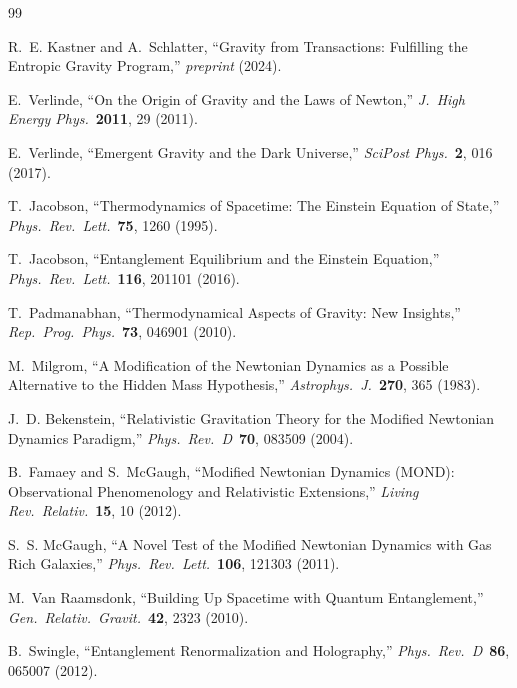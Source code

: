 \documentclass[11pt, a4paper]{article}
\theoremstyle{plain}
\theoremstyle{definition}
\theoremstyle{remark}
\begin{document}
\begin{thebibliography}{99}

R.~E. Kastner and A.~Schlatter,
``Gravity from Transactions: Fulfilling the Entropic Gravity Program,''
\textit{preprint} (2024).

E.~Verlinde,
``On the Origin of Gravity and the Laws of Newton,''
\textit{J.\ High Energy Phys.}\ \textbf{2011}, 29 (2011).

E.~Verlinde,
``Emergent Gravity and the Dark Universe,''
\textit{SciPost Phys.}\ \textbf{2}, 016 (2017).

T.~Jacobson,
``Thermodynamics of Spacetime: The Einstein Equation of State,''
\textit{Phys.\ Rev.\ Lett.}\ \textbf{75}, 1260 (1995).

T.~Jacobson,
``Entanglement Equilibrium and the Einstein Equation,''
\textit{Phys.\ Rev.\ Lett.}\ \textbf{116}, 201101 (2016).

T.~Padmanabhan,
``Thermodynamical Aspects of Gravity: New Insights,''
\textit{Rep.\ Prog.\ Phys.}\ \textbf{73}, 046901 (2010).

M.~Milgrom,
``A Modification of the Newtonian Dynamics as a Possible Alternative to the Hidden
Mass Hypothesis,''
\textit{Astrophys.\ J.}\ \textbf{270}, 365 (1983).

J.~D. Bekenstein,
``Relativistic Gravitation Theory for the Modified Newtonian Dynamics Paradigm,''
\textit{Phys.\ Rev.\ D}\ \textbf{70}, 083509 (2004).

B.~Famaey and S.~McGaugh,
``Modified Newtonian Dynamics (MOND): Observational Phenomenology and Relativistic
Extensions,''
\textit{Living Rev.\ Relativ.}\ \textbf{15}, 10 (2012).

S.~S. McGaugh,
``A Novel Test of the Modified Newtonian Dynamics with Gas Rich Galaxies,''
\textit{Phys.\ Rev.\ Lett.}\ \textbf{106}, 121303 (2011).

M.~Van Raamsdonk,
``Building Up Spacetime with Quantum Entanglement,''
\textit{Gen.\ Relativ.\ Gravit.}\ \textbf{42}, 2323 (2010).

B.~Swingle,
``Entanglement Renormalization and Holography,''
\textit{Phys.\ Rev.\ D}\ \textbf{86}, 065007 (2012).


\end{thebibliography}
\end{document}
